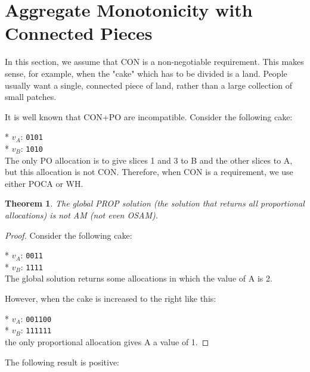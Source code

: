 \documentclass[a4paper,12pt]{article}
\newcommand{\biexample}[2]{
* \hspace{1cm}   $v_A$: \texttt{#1} \\
* \hspace{1cm}   $v_B$: \texttt{#2} \\
}
\newtheorem{thm}{Theorem}[section]
\begin{document}
\section{Aggregate Monotonicity with Connected Pieces}
In this section, we assume that CON is a non-negotiable requirement. This makes sense, for example, when the "cake" which has to be divided is a land. People usually want a single, connected piece of land, rather than a large collection of small patches.

It is well known that CON+PO are incompatible. Consider the following cake:

\biexample{0101}{1010}

The only PO allocation is to give slices 1 and 3 to B and the other slices to A, but this allocation is not CON. Therefore, when CON is a requirement, we use either POCA or WH.

\begin{thm}
The global PROP solution (the solution that returns all proportional allocations) is not AM (not even OSAM).
\end{thm}
\begin{proof}
Consider the following cake:

\biexample{0011}{1111}

The global solution returns some allocations in which the value of A is 2.

However, when the cake is increased to the right like this:

\biexample{001100}{111111}

the only proportional allocation gives A a value of 1.
\end{proof}


The following result is positive:
\end{document}
